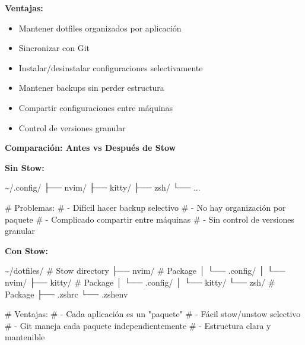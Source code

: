 \documentclass[
  doc,
  floatsintext,
  longtable,
  a4paper,
  nolmodern,
  notxfonts,
  notimes,
  12pt,
  colorlinks=true,linkcolor=blue,citecolor=blue,urlcolor=blue]{apa7}
\newenvironment{Shaded}{\begin{snugshade}}{\end{snugshade}}
\newcommand{\CommentTok}[1]{\textcolor[rgb]{0.37,0.37,0.37}{#1}}
\newcommand{\ExtensionTok}[1]{\textcolor[rgb]{0.00,0.23,0.31}{#1}}
\newcommand{\NormalTok}[1]{\textcolor[rgb]{0.00,0.23,0.31}{#1}}
\providecommand{\tightlist}{%
  \setlength{\itemsep}{0pt}\setlength{\parskip}{0pt}}
\begin{document}
\textbf{Ventajas:}

\begin{itemize}
\tightlist
\item
  Mantener dotfiles organizados por aplicación
\item
  Sincronizar con Git
\item
  Instalar/desinstalar configuraciones selectivamente
\item
  Mantener backups sin perder estructura
\item
  Compartir configuraciones entre máquinas
\item
  Control de versiones granular
\end{itemize}

\textbf{Comparación: Antes vs Después de Stow}

\textbf{Sin Stow:}

\begin{Shaded}
\begin{Highlighting}[]
\ExtensionTok{\textasciitilde{}/.config/}
\ExtensionTok{├──}\NormalTok{ nvim/}
\ExtensionTok{├──}\NormalTok{ kitty/}
\ExtensionTok{├──}\NormalTok{ zsh/}
\ExtensionTok{└──}\NormalTok{ ...}

\CommentTok{\# Problemas:}
\CommentTok{\# {-} Difícil hacer backup selectivo}
\CommentTok{\# {-} No hay organización por paquete}
\CommentTok{\# {-} Complicado compartir entre máquinas}
\CommentTok{\# {-} Sin control de versiones granular}
\end{Highlighting}
\end{Shaded}

\textbf{Con Stow:}

\begin{Shaded}
\begin{Highlighting}[]
\ExtensionTok{\textasciitilde{}/dotfiles/}          \CommentTok{\# Stow directory}
\ExtensionTok{├──}\NormalTok{ nvim/           }\CommentTok{\# Package}
\ExtensionTok{│}\NormalTok{   └── .config/}
\ExtensionTok{│}\NormalTok{       └── nvim/}
\ExtensionTok{├──}\NormalTok{ kitty/          }\CommentTok{\# Package}
\ExtensionTok{│}\NormalTok{   └── .config/}
\ExtensionTok{│}\NormalTok{       └── kitty/}
\ExtensionTok{└──}\NormalTok{ zsh/            }\CommentTok{\# Package}
    \ExtensionTok{├──}\NormalTok{ .zshrc}
    \ExtensionTok{└──}\NormalTok{ .zshenv}

\CommentTok{\# Ventajas:}
\CommentTok{\# {-} Cada aplicación es un "paquete"}
\CommentTok{\# {-} Fácil stow/unstow selectivo}
\CommentTok{\# {-} Git maneja cada paquete independientemente}
\CommentTok{\# {-} Estructura clara y mantenible}
\end{Highlighting}
\end{Shaded}
\end{document}
